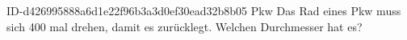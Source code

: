 \begin{exercise}
      {ID-d426995888a6d1e22f96b3a3d0ef30ead32b8b05}
      {Pkw}
  \ifproblem\problem
    Das Rad eines Pkw muss sich 400 mal drehen, damit es 
    zurücklegt. Welchen Durchmesser hat es?
  \fi
\end{exercise}
